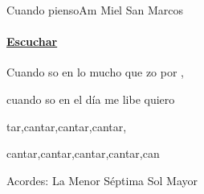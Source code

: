 \documentclass[12pt, spanish]{book}
\newcommand{\NotCCLIed}{\relax}
\begin{document}
    \begin{song}{Cuando pienso}{Am}
    {} %
    {Miel San Marcos}
    {} %
    {} %
        \ifChordBk
        \paragraph{\mbox{}\hfill\protect\href{https://open.spotify.com/intl-es/track/1IPT74e1R3lmAqYcPP53Md}{Escuchar}\mbox{}\hfill}
        \fi

        \begin{SBChorus}
            Cuando so en lo mucho que zo por ,

            cuando so en el día  me libe quiero
        \end{SBChorus}

        \begin{SBOpGroup}
            tar,cantar,cantar,cantar,

            cantar,cantar,cantar,cantar,can
        \end{SBOpGroup}

        \ifChordBk
        \begin{SBOpGroup}
            Acordes:
            \upchord{\Amseven}\qquad La Menor S\'eptima \hfill
            \upchord{\G}\qquad Sol Mayor \hfill\null\break
        \end{SBOpGroup}
        \fi
    \end{song}
\end{document}

